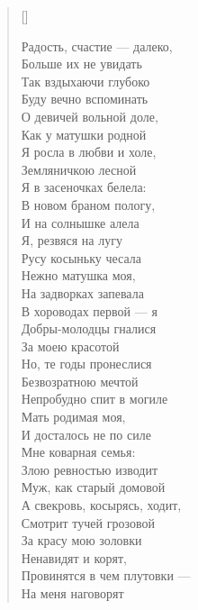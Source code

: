 \settowidth{\versewidth}{Радость, счастие --- далеко,}
\begin{verse}[\versewidth]
\begin{altverse}
Радость, счастие --- далеко,\\
    Больше их не увидать\ldotst\\
Так вздыхаючи глубоко\\
    Буду вечно вспоминать\\
О девичей вольной доле,\\
    Как у матушки родной\\
Я росла в любви и холе,\\
    Земляничкою лесной\ldotst\\
Я в засеночках белела:\\
    В новом браном пологу,\\
И на солнышке алела\\
    Я, резвяся на лугу\ldotst\\
Русу косыньку чесала\\
    Нежно матушка моя,\\
На задворках запевала\\
    В хороводах первой --- я\ldotst\\
Добры-молодцы гналися\\
    За моею красотой\ldotst\\
Но, те годы пронеслися\\
    Безвозратною мечтой\ldotst\\
Непробудно спит в могиле\\
    Мать родимая моя,\\
И досталось не по силе\\
    Мне коварная семья:\\
Злою ревностью изводит\\
    Муж, как старый домовой\ldotst\\
А свекровь, косырясь, ходит,\\
    Смотрит тучей грозовой\ldotst\\
За красу мою золовки\\
    Ненавидят и корят,\\
Провинятся в чем плутовки ---\\
    На меня наговорят\ldotst\\

\end{altverse}
\end{verse}
